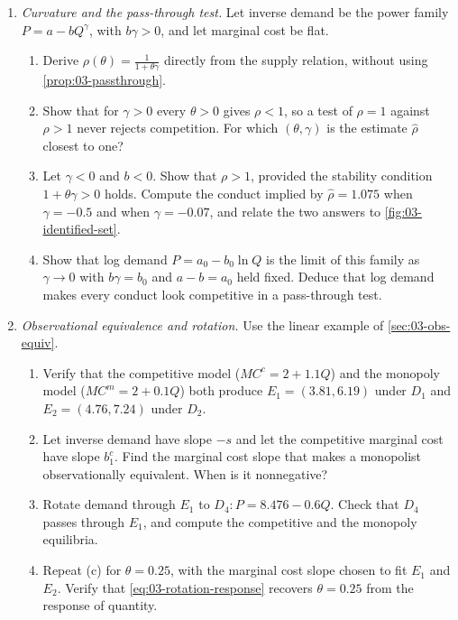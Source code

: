 \begin{enumerate}[label=\arabic*., leftmargin=*, itemsep=6pt]
\item \textit{Curvature and the pass-through test.} Let inverse demand be the power family $P = a - bQ^{\gamma}$, with
$b\gamma > 0$, and let marginal cost be flat.
\begin{enumerate}[label=(\alph*)]
  \item Derive $\rho(\theta) = \frac{1}{1 + \theta\gamma}$ directly from the supply relation, without using
  \cref{prop:03-passthrough}.
  \item Show that for $\gamma > 0$ every $\theta > 0$ gives $\rho < 1$, so a test of $\rho = 1$ against $\rho > 1$ never
  rejects competition. For which $(\theta, \gamma)$ is the estimate $\hat\rho$ closest to one?
  \item Let $\gamma < 0$ and $b < 0$. Show that $\rho > 1$, provided the stability condition
  $1 + \theta\gamma > 0$ holds. Compute the conduct implied by $\hat\rho = 1.075$ when
  $\gamma = -0.5$ and when $\gamma = -0.07$, and relate the two answers to \cref{fig:03-identified-set}.
  \item Show that log demand $P = a_0 - b_0\ln Q$ is the limit of this family as $\gamma \to 0$ with $b\gamma = b_0$ and
  $a - b = a_0$ held fixed. Deduce that log demand makes every conduct look competitive in a pass-through test.
\end{enumerate}

\item \textit{Observational equivalence and rotation.} Use the linear example of \cref{sec:03-obs-equiv}.
\begin{enumerate}[label=(\alph*)]
  \item Verify that the competitive model ($MC^c = 2 + 1.1Q$) and the monopoly model ($MC^m = 2 + 0.1Q$) both produce
  $E_1 = (3.81, 6.19)$ under $D_1$ and $E_2 = (4.76, 7.24)$ under $D_2$.
  \item Let inverse demand have slope $-s$ and let the competitive marginal cost have slope $b^c_1$. Find the marginal
  cost slope that makes a monopolist observationally equivalent. When is it nonnegative?
  \item Rotate demand through $E_1$ to $D_4\colon P = 8.476 - 0.6Q$. Check that $D_4$ passes through $E_1$, and compute
  the competitive and the monopoly equilibria.
  \item Repeat (c) for $\theta = 0.25$, with the marginal cost slope chosen to fit $E_1$ and $E_2$. Verify that
  \eqref{eq:03-rotation-response} recovers $\theta = 0.25$ from the response of quantity.
\end{enumerate}


\end{enumerate}

